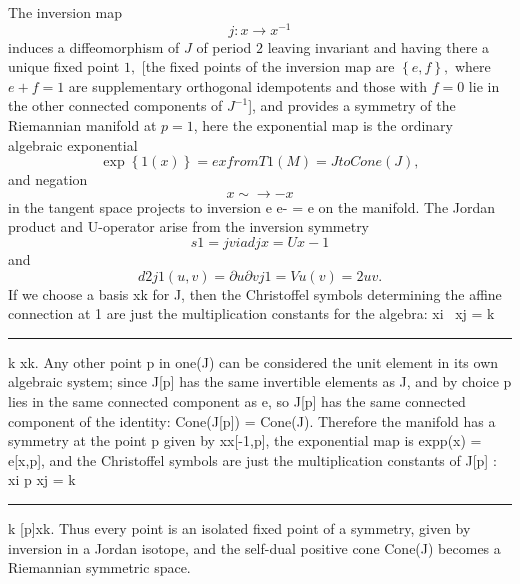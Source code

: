 \documentclass[aps,preprint]{revtex4}%
\providecommand{\U}[1]{\protect\rule{.1in}{.1in}}
\begin{document}
The inversion map
\begin{equation}
j:x\rightarrow x^{-1}%
\end{equation}
induces a diffeomorphism of $J$ of period $2$ leaving invariant and having
there a unique fixed point $1,$ [the fixed points of the inversion map are
$\left\{  e,f\right\}  ,$ where  $e+f=1$ are supplementary orthogonal
idempotents and those with $f=0$ lie in the other connected components of
$J^{-1}$], and provides a symmetry of the Riemannian manifold at $p=1$,  here
the exponential map is the ordinary algebraic exponential
\begin{equation}
\exp\left\{  1(x)\right\}  =exfromT1(M)=JtoCone(J),
\end{equation}
and negation
\begin{equation}
x\sim\rightarrow-x
\end{equation}
in the tangent space projects to inversion e e- = e on the manifold. The
Jordan product and U-operator arise from the inversion symmetry
\begin{equation}
s1=jviadjx=Ux-1
\end{equation}
and
\begin{equation}
d2j1(u,v)=\partial u\partial vj1=Vu(v)=2uv.
\end{equation}
If we choose a basis xk for J, then the Christoffel symbols determining the
affine connection at 1 are just the multiplication constants for the algebra:
xi \textbullet\ xj = k \U{393}k xk. Any other point p in one(J) can be
considered the unit element in its own algebraic system; since J[p] has the
same invertible elements as J, and by choice p lies in the same connected
component as e, so J[p] has the same connected component of the identity:
Cone(J[p]) = Cone(J). Therefore the manifold has a symmetry at the point p
given by x\qquad x[-1,p], the exponential map is expp(x) = e[x,p], and the
Christoffel symbols are just the multiplication constants of J[p] : xi
\textbullet p xj = k \U{393}k [p]xk. Thus every point is an isolated fixed
point of a symmetry, given by inversion in a Jordan isotope, and the self-dual
positive cone Cone(J) becomes a Riemannian symmetric space.
\end{document}
